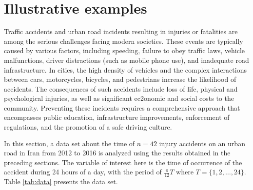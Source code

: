 \documentclass[twoside]{article}
\begin{document}
\section{Illustrative examples} 
Traffic accidents and urban road incidents resulting in injuries or fatalities are among the serious challenges facing modern societies. These events are typically caused by various factors, including speeding, failure to obey traffic laws, vehicle malfunctions, driver distractions (such as mobile phone use), and inadequate road infrastructure. In cities, the high density of vehicles and the complex interactions between cars, motorcycles, bicycles, and pedestrians increase the likelihood of accidents. The consequences of such accidents include loss of life, physical and psychological injuries, as well as significant ec2onomic and social costs to the community. Preventing these incidents requires a comprehensive approach that encompasses public education, infrastructure improvements, enforcement of regulations, and the promotion of a safe driving culture.

In this section, a data set about the  time of $n=42$ injury accidents on an urban road in Iran from 2012 to 2016 is analyzed using the results obtained  in the preceding sections. The variable of interest here is the time of occurrence of the accident during 24 hours of a day,  {with the period of $\displaystyle \frac{\pi}{12}T$ where $T=\lbrace 1,2,\ldots, 24\rbrace$}. Table \ref{tab:data} presents the data set.
\end{document}
